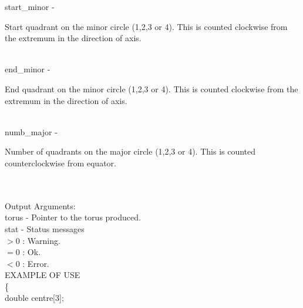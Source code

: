         \>\>    {\fov start\_minor}  \> - \> \begin{minipg2}
                                               Start quadrant on the
                                               minor circle (1,2,3 or 4).
                                               This is counted clockwise
                                               from the extremum in the
                                               direction of axis.
                                             \end{minipg2}\\[0.8ex]
        \>\>    {\fov end\_minor}    \> - \> \begin{minipg2}
                                               End quadrant on the minor
                                               circle (1,2,3 or 4). This
                                               is counted clockwise from
                                               the extremum in the
                                               direction of axis.
                                             \end{minipg2}\\[0.8ex]
        \>\>    {\fov numb\_major}   \> - \> \begin{minipg2}
                                               Number of quadrants on
                                               the major circle (1,2,3
                                               or 4). This is counted
                                               counterclockwise from
                                               equator.
                                             \end{minipg2}\\[0.8ex]
\\
        \>Output Arguments:\\
        \>\>    {\fov torus} \> - \> Pointer to the torus produced.\\
        \>\>    {\fov stat}     \> - \> Status messages\\
                \>\>\>\>\>              $> 0$   : Warning.\\
                \>\>\>\>\>              $= 0$   : Ok.\\
                \>\>\>\>\>              $< 0$   : Error.\\
\newpagetabs
EXAMPLE OF USE\\
        \>      \{ \\
        \>\>    double \> {\fov centre}[3];\\
